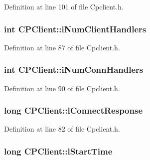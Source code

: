 \-Definition at line 101 of file \-Cpclient.\-h.

\hypertarget{class_c_p_client_a7299daff3cd3437159533c9011ff96a0}{
\subsubsection[{i\-Num\-Client\-Handlers}]{\setlength{\rightskip}{0pt plus 5cm}int {\bf \-C\-P\-Client\-::i\-Num\-Client\-Handlers}}}\label{class_c_p_client_a7299daff3cd3437159533c9011ff96a0}


\-Definition at line 87 of file \-Cpclient.\-h.

\hypertarget{class_c_p_client_a5a9c9fb8e3e0c1faee5c9740fab8c8e7}{
\subsubsection[{i\-Num\-Conn\-Handlers}]{\setlength{\rightskip}{0pt plus 5cm}int {\bf \-C\-P\-Client\-::i\-Num\-Conn\-Handlers}}}\label{class_c_p_client_a5a9c9fb8e3e0c1faee5c9740fab8c8e7}


\-Definition at line 90 of file \-Cpclient.\-h.

\hypertarget{class_c_p_client_aa5d2b8ddd7b8ba324be40578ed419c52}{
\subsubsection[{l\-Connect\-Response}]{\setlength{\rightskip}{0pt plus 5cm}long {\bf \-C\-P\-Client\-::l\-Connect\-Response}}}\label{class_c_p_client_aa5d2b8ddd7b8ba324be40578ed419c52}


\-Definition at line 82 of file \-Cpclient.\-h.

\hypertarget{class_c_p_client_a8d8282a0802a5d2cc96da57905fa9f81}{
\subsubsection[{l\-Start\-Time}]{\setlength{\rightskip}{0pt plus 5cm}long {\bf \-C\-P\-Client\-::l\-Start\-Time}}}\label{class_c_p_client_a8d8282a0802a5d2cc96da57905fa9f81}


